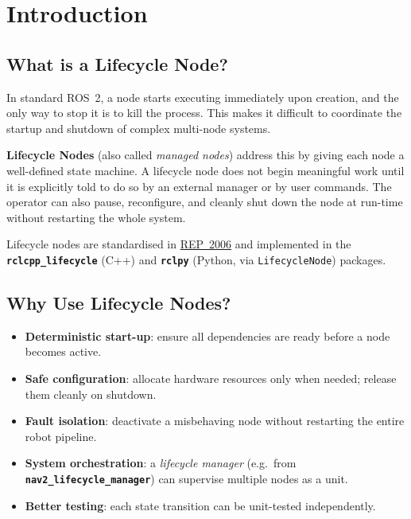 \documentclass[12pt,a4paper]{article}
\newcommand{\code}[1]{\texttt{#1}}
\newcommand{\pkg}[1]{\textbf{\texttt{#1}}}
\begin{document}
\tableofcontents
\newpage

\section{Introduction}
\label{sec:intro}

\subsection{What is a Lifecycle Node?}

In standard ROS~2, a node starts executing immediately upon creation, and the
only way to stop it is to kill the process.  This makes it difficult to
coordinate the startup and shutdown of complex multi-node systems.

\textbf{Lifecycle Nodes} (also called \emph{managed nodes}) address this by
giving each node a well-defined state machine.  A lifecycle node does not
begin meaningful work until it is explicitly told to do so by an external
manager or by user commands.  The operator can also pause, reconfigure, and
cleanly shut down the node at run-time without restarting the whole system.

Lifecycle nodes are standardised in
\href{https://design.ros2.org/articles/node_lifecycle.html}{REP~2006} and
implemented in the \pkg{rclcpp\_lifecycle} (C++) and
\pkg{rclpy} (Python, via \code{LifecycleNode}) packages.

\subsection{Why Use Lifecycle Nodes?}

\begin{itemize}[noitemsep]
  \item \textbf{Deterministic start-up}: ensure all dependencies are ready
        before a node becomes active.
  \item \textbf{Safe configuration}: allocate hardware resources only when
        needed; release them cleanly on shutdown.
  \item \textbf{Fault isolation}: deactivate a misbehaving node without
        restarting the entire robot pipeline.
  \item \textbf{System orchestration}: a \emph{lifecycle manager}
        (e.g.\ from \pkg{nav2\_lifecycle\_manager}) can supervise multiple
        nodes as a unit.
  \item \textbf{Better testing}: each state transition can be unit-tested
        independently.
\end{itemize}
\end{document}
